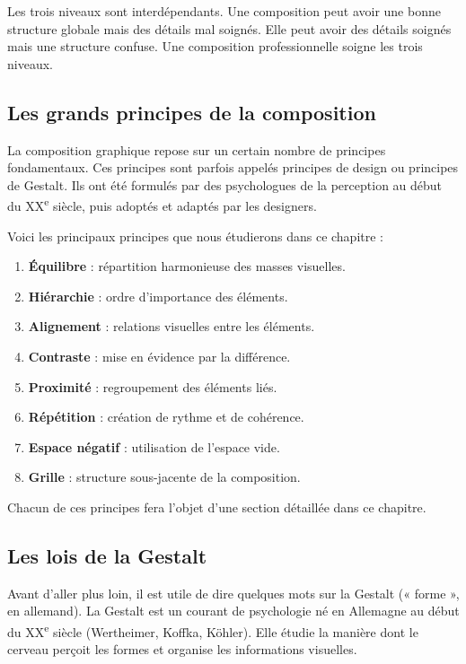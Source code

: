 Les trois niveaux sont interdépendants. Une composition peut avoir une bonne structure globale mais des détails mal soignés. Elle peut avoir des détails soignés mais une structure confuse. Une composition professionnelle soigne les trois niveaux.

\subsection{Les grands principes de la composition}

La composition graphique repose sur un certain nombre de principes fondamentaux. Ces principes sont parfois appelés principes de design ou principes de Gestalt. Ils ont été formulés par des psychologues de la perception au début du XX\textsuperscript{e} siècle, puis adoptés et adaptés par les designers.

Voici les principaux principes que nous étudierons dans ce chapitre :
\begin{enumerate}
  \item \textbf{Équilibre} : répartition harmonieuse des masses visuelles.
  \item \textbf{Hiérarchie} : ordre d'importance des éléments.
  \item \textbf{Alignement} : relations visuelles entre les éléments.
  \item \textbf{Contraste} : mise en évidence par la différence.
  \item \textbf{Proximité} : regroupement des éléments liés.
  \item \textbf{Répétition} : création de rythme et de cohérence.
  \item \textbf{Espace négatif} : utilisation de l'espace vide.
  \item \textbf{Grille} : structure sous-jacente de la composition.
\end{enumerate}

Chacun de ces principes fera l'objet d'une section détaillée dans ce chapitre.

\subsection{Les lois de la Gestalt}

Avant d'aller plus loin, il est utile de dire quelques mots sur la Gestalt (« forme », en allemand). La Gestalt est un courant de psychologie né en Allemagne au début du XX\textsuperscript{e} siècle (Wertheimer, Koffka, Köhler). Elle étudie la manière dont le cerveau perçoit les formes et organise les informations visuelles.

